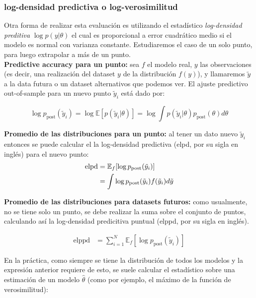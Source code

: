 \subsubsection{log-densidad predictiva o log-verosimilitud}
Otra forma de realizar esta evaluación es utilizando el estadístico \emph{log-densidad preditiva} $\log p(y|\theta)$ el cual es proporcional a error cuadrático medio si el modelo es normal con varianza constante. Estudiaremos el caso de un solo punto, para luego extrapolar a más de un punto.\\

\textbf{Predictive accuracy para un punto:} sea $f$ el modelo real, $y$ las observaciones (es decir, una realización del dataset $y$ de la distribución $f(y)$), y llamaremos $\tilde{y}$ a la data futura o un dataset alternativos que podemos ver. El ajuste predictivo out-of-sample para un nuevo punto $\tilde{y}_i$ está dado por:

\begin{equation}
\log p_{\text{post}}(\tilde{y}_i) = \log \mathbb{E}[p(\tilde{y}_i|\theta)] = \log \int p(\tilde{y}_i|\theta)p_{\text{post}}(\theta)d\theta
\end{equation}

\textbf{Promedio de las distribuciones para un punto:} al tener un dato nuevo $\tilde{y}_i$ entonces se puede calcular el la log-densidad predictiva (elpd, por su sigla en inglés) para el nuevo punto:
\begin{align}
\notag \text{elpd} & = \mathbb{E}_f[\log p_{\text{post}}(\tilde{y}_i)]\\
& = \int \log p_{\text{post}}(\tilde{y}_i) f(\tilde{y}_i)d\tilde{y}
\end{align}

\textbf{Promedio de las distribuciones para datasets futuros:} como usualmente, no se tiene solo un punto, se debe realizar la suma sobre el conjunto de puntos, calculando así la log-densidad predicitiva puntual (elppd, por su sigla en inglés).

\begin{align}
\text{elppd} & = \sum_{i=1}^N \mathbb{E}_f[\log p_{\text{post}}(\tilde{y}_i)]
\end{align}

En la práctica, como siempre se tiene la distribución de todos los modelos y la expresión anterior requiere de esto, se suele calcular el estadístico sobre una estimación de un modelo $\hat{\theta}$ (como por ejemplo, el máximo de la función de verosimilitud):

